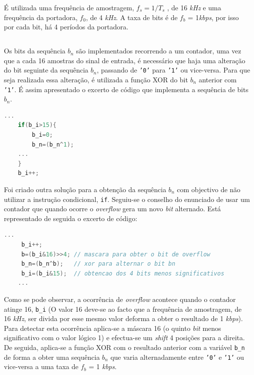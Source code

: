 \documentclass[11pt]{article}
\numberwithin{equation}{section}
\begin{document}
É utilizada uma frequência de amostragem, $f_s=1/T_s$ , de 16 \textit{kHz} e uma frequência da portadora, $f_0$, de 4 \textit{kHz}. A taxa de bits é de $f_b$ = 1\textit{kbps}, por isso por cada bit, há 4 períodos da portadora.  


\subsection{} %

Os bits da sequência $b_n$ são implementados recorrendo a um contador, uma vez que a cada 16 amostras do sinal de entrada, é necessário que haja uma alteração do bit seguinte da sequência $b_n$, passando de \texttt{'0'} para \texttt{'1'} ou vice-versa. Para que seja realizada essa alteração, é utilizada a função XOR do bit $b_n$ anterior com \texttt{'1'}. É assim apresentado o excerto de código que implementa a sequência de bits $b_n$. 

\begin{lstlisting}[language=C]
	...
	if(b_i>15){
		b_i=0;
		b_n=(b_n^1); 
	...
	}
	b_i++; 
\end{lstlisting}

Foi criado outra solução para a obtenção da sequência $b_n$ com objectivo de não utilizar a instrução condicional, \texttt{if}. Seguiu-se o conselho do enunciado de usar um contador que quando ocorre o \textit{overflow} gera um novo \textit{bit} alternado. Está representado de seguida o excerto de código:

\begin{lstlisting}[language=C]
	...
	 b_i++;			
	 b=(b_i&16)>>4; // mascara para obter o bit de overflow
	 b_n=(b_n^b);	// xor para alternar o bit bn
	 b_i=(b_i&15);  // obtencao dos 4 bits menos significativos
	...
\end{lstlisting}

Como se pode observar, a ocorrência de \textit{overflow} acontece quando o contador atinge 16, \texttt{b\_i} (O valor 16 deve-se ao facto que a frequência de amostragem, de 16 \textit{kHz}, ser divida por esse mesmo valor deforma a obter o resultado de 1 \textit{kbps}). Para detectar esta ocorrência aplica-se a máscara 16 (o quinto \textit{bit} menos significativo com o valor lógico 1) e efectua-se um \textit{shift} 4 posições para a direita. De seguida, aplica-se a função XOR com o resultado anterior com a variável \texttt{b\_n} de forma a obter uma sequência $b_n$ que varia alternadamente entre \texttt{'0'} e \texttt{'1'} ou vice-versa a uma taxa de $f_b$ = 1 \textit{kbps}.
\end{document}
